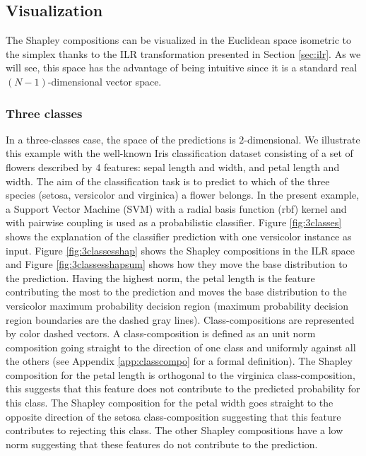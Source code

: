 \documentclass{article}
\theoremstyle{plain}
\theoremstyle{definition}
\theoremstyle{remark}
\begin{document}
\subsection{Visualization}

The Shapley compositions can be visualized in the Euclidean space isometric to the simplex thanks to the ILR transformation presented in Section \ref{sec:ilr}. As we will see, this space has the advantage of being intuitive since it is a standard real $(N-1)$-dimensional vector space.

\subsubsection{Three classes}

In a three-classes case, the space of the predictions is $2$-dimensional. We illustrate this example with the well-known Iris classification dataset consisting of a set of flowers described by 4 features: sepal length and width, and petal length and width. The aim of the classification task is to predict to which of the three species (setosa, versicolor and virginica) a flower belongs. In the present example, a Support Vector Machine (SVM) with a radial basis function (rbf) kernel and with pairwise coupling \cite{wu2003probability} is used as a probabilistic classifier. Figure \ref{fig:3classes} shows the explanation of the classifier prediction with one versicolor instance as input. Figure \ref{fig:3classesshap} shows the Shapley compositions in the ILR space and Figure \ref{fig:3classesshapsum} shows how they move the base distribution to the prediction. Having the highest norm, the petal length is the feature contributing the most to the prediction and moves the base distribution to the versicolor maximum probability decision region (maximum probability decision region boundaries are the dashed gray lines). Class-compositions are represented by color dashed vectors. A class-composition is defined as an unit norm composition going straight to the direction of one class and uniformly against all the others (see Appendix \ref{app:classcompo} for a formal definition). The Shapley composition for the petal length is orthogonal to the virginica class-composition, this suggests that this feature does not contribute to the predicted probability for this class. The Shapley composition for the petal width goes straight to the opposite direction of the setosa class-composition suggesting that this feature contributes to rejecting this class. The other Shapley compositions have a low norm suggesting that these features do not contribute to the prediction.
\end{document}
